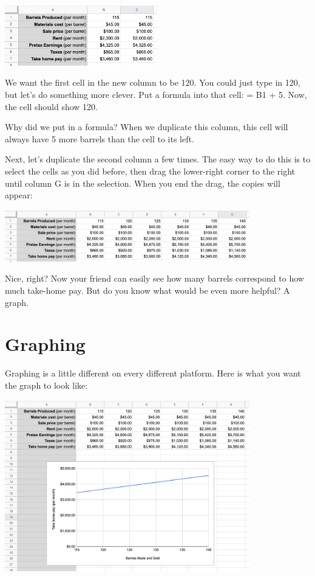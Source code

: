 \includegraphics[width=0.5\textwidth]{BarrelCopyPaste.png}

We want the first cell in the new column to be 120. You could just
type in 120, but let's do something more clever. Put a formula into that
cell: = B1 + 5.  Now, the cell should show 120.

Why did we put in a formula? When we duplicate this column, this cell
will always have 5 more barrels than the cell to its left.

Next, let's duplicate the second column a few times. The easy way to do
this is to select the cells as you did before, then drag the lower-right
corner to the right until column G is in the selection. When you end
the drag, the copies will appear:

\includegraphics[width=0.8\textwidth]{BarrelDragPaste.png}

Nice, right? Now your friend can easily see how many barrels
correspond to how much take-home pay. But do you know what would be even more helpful? A graph.

\section{Graphing}

Graphing is a little different on every different platform.  Here is what you want the graph to look like:

\includegraphics[width=0.8\textwidth]{BarrelGraph.png}

